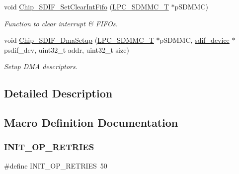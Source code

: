 \begin{DoxyCompactItemize}
void \hyperlink{group___s_d_i_f__18_x_x__43_x_x_ga8b2559327fedf08efe8a5e87ba6f6e54}{Chip\+\_\+\+S\+D\+I\+F\+\_\+\+Set\+Clear\+Int\+Fifo} (\hyperlink{struct_l_p_c___s_d_m_m_c___t}{L\+P\+C\+\_\+\+S\+D\+M\+M\+C\+\_\+T} $\ast$p\+S\+D\+M\+MC)
\begin{DoxyCompactList}\small\item\em Function to clear interrupt \& F\+I\+F\+Os. \end{DoxyCompactList}\item 
void \hyperlink{group___s_d_i_f__18_x_x__43_x_x_ga0c02401583b78fec76f6366730e1ff5f}{Chip\+\_\+\+S\+D\+I\+F\+\_\+\+Dma\+Setup} (\hyperlink{struct_l_p_c___s_d_m_m_c___t}{L\+P\+C\+\_\+\+S\+D\+M\+M\+C\+\_\+T} $\ast$p\+S\+D\+M\+MC, \hyperlink{group___s_d_i_f__18_x_x__43_x_x_ga14a605aa797cde1201ae414437a32292}{sdif\+\_\+device} $\ast$psdif\+\_\+dev, uint32\+\_\+t addr, uint32\+\_\+t size)
\begin{DoxyCompactList}\small\item\em Setup D\+MA descriptors. \end{DoxyCompactList}\end{DoxyCompactItemize}


\subsection{Detailed Description}


\subsection{Macro Definition Documentation}
\mbox{\label{group___s_d_i_f__18_x_x__43_x_x_gaa5c496657573274b20f193c92686cd67}} 
\subsubsection{\texorpdfstring{I\+N\+I\+T\+\_\+\+O\+P\+\_\+\+R\+E\+T\+R\+I\+ES}{INIT\_OP\_RETRIES}}
{\footnotesize\ttfamily \#define I\+N\+I\+T\+\_\+\+O\+P\+\_\+\+R\+E\+T\+R\+I\+ES~50}

